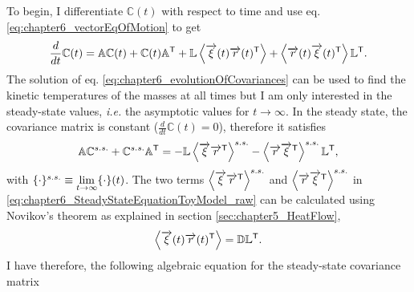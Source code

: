 To begin, I differentiate $\mathbb{C}(t)$ with respect to time and use eq. \eqref{eq:chapter6_vectorEqOfMotion} to get
%
\begin{equation}
  \frac{d}{dt}\mathbb{C}(t) =
  \mathbb{A}\mathbb{C}(t) +
  \mathbb{C}(t) \mathbb{A}^\mathsf{T}
  +
  \mathbb{L}\expval{ \overrightarrow{\xi}(t)\overrightarrow{r}(t)^\mathsf{T}}
  +
  \expval{ \overrightarrow{r}(t)\overrightarrow{\xi}(t)^\mathsf{T}}\mathbb{L}^\mathsf{T}.
  \label{eq:chapter6_evolutionOfCovariances}
\end{equation}
%
The solution of eq. \eqref{eq:chapter6_evolutionOfCovariances} can be used to find the kinetic temperatures of the masses at all times but I am only interested in the steady-state values, \textit{i.e.} the asymptotic values for $t\to \infty$. In the steady state, the covariance matrix is constant ($\frac{d}{dt}\mathbb{C}(t)=0$), therefore it satisfies
%
\begin{equation}
  \mathbb{A}\mathbb{C}^{s.s.} +
  \mathbb{C}^{s.s.} \mathbb{A}^\mathsf{T}=
  - \mathbb{L}\expval{ \overrightarrow{\xi}\overrightarrow{r}^\mathsf{T}}^{s.s.}
  - \expval{ \overrightarrow{r}\overrightarrow{\xi}^\mathsf{T}}^{s.s.}\mathbb{L}^\mathsf{T},
  \label{eq:chapter6_SteadyStateEquationToyModel_raw}
\end{equation}
%
with $\small\{\cdot\small\}^{s.s.}\equiv \lim\limits_{t \to \infty} \small\{\cdot\small\}(t)$. The two terms $\expval{ \overrightarrow{\xi}\overrightarrow{r}^\mathsf{T}}^{s.s.}$ and  $\expval{\overrightarrow{r}\overrightarrow{\xi}^\mathsf{T}}^{s.s.}$ in \eqref{eq:chapter6_SteadyStateEquationToyModel_raw} can be calculated using Novikov's theorem \cite{Novikov1965} as explained in section \ref{sec:chapter5_HeatFlow},
%
\begin{equation}
  \expval{ \overrightarrow{\xi}(t)\overrightarrow{r}(t)^\mathsf{T}} = \mathbb{D}\mathbb{L}^\mathsf{T}.
\end{equation}
%
I have therefore, the following algebraic equation for the steady-state covariance matrix
